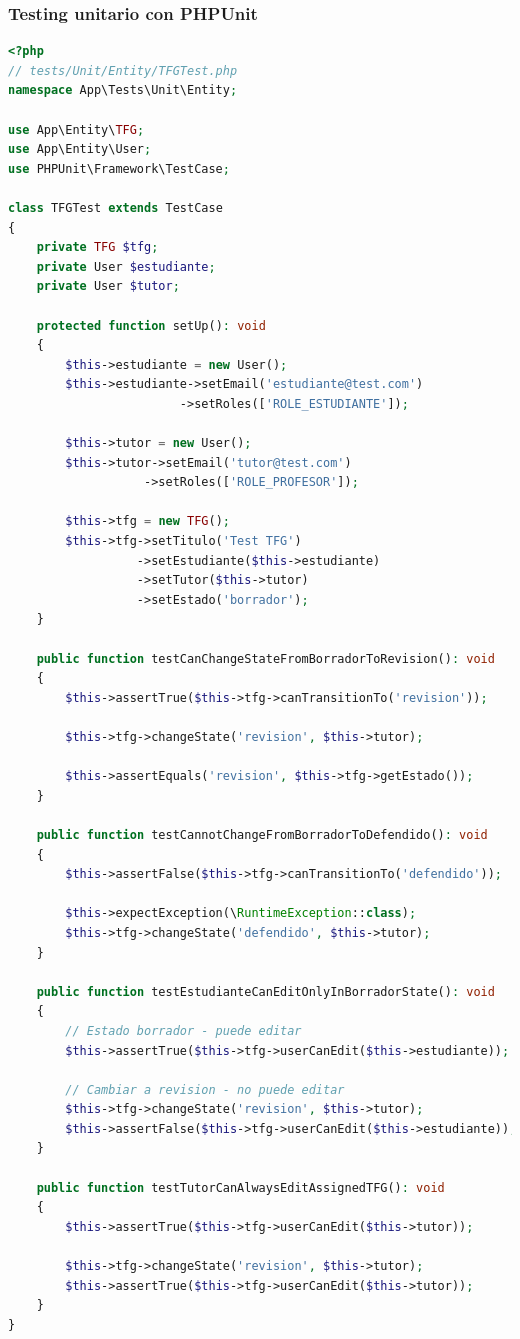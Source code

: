 \documentclass[12pt,a4paper,oneside]{report}
\begin{document}
\subsubsection{Testing unitario con
PHPUnit}\label{testing-unitario-con-phpunit}

\begin{lstlisting}[language=PHP]
<?php
// tests/Unit/Entity/TFGTest.php
namespace App\Tests\Unit\Entity;

use App\Entity\TFG;
use App\Entity\User;
use PHPUnit\Framework\TestCase;

class TFGTest extends TestCase
{
    private TFG $tfg;
    private User $estudiante;
    private User $tutor;

    protected function setUp(): void
    {
        $this->estudiante = new User();
        $this->estudiante->setEmail('estudiante@test.com')
                        ->setRoles(['ROLE_ESTUDIANTE']);

        $this->tutor = new User();
        $this->tutor->setEmail('tutor@test.com')
                   ->setRoles(['ROLE_PROFESOR']);

        $this->tfg = new TFG();
        $this->tfg->setTitulo('Test TFG')
                  ->setEstudiante($this->estudiante)
                  ->setTutor($this->tutor)
                  ->setEstado('borrador');
    }

    public function testCanChangeStateFromBorradorToRevision(): void
    {
        $this->assertTrue($this->tfg->canTransitionTo('revision'));
        
        $this->tfg->changeState('revision', $this->tutor);
        
        $this->assertEquals('revision', $this->tfg->getEstado());
    }

    public function testCannotChangeFromBorradorToDefendido(): void
    {
        $this->assertFalse($this->tfg->canTransitionTo('defendido'));
        
        $this->expectException(\RuntimeException::class);
        $this->tfg->changeState('defendido', $this->tutor);
    }

    public function testEstudianteCanEditOnlyInBorradorState(): void
    {
        // Estado borrador - puede editar
        $this->assertTrue($this->tfg->userCanEdit($this->estudiante));
        
        // Cambiar a revision - no puede editar
        $this->tfg->changeState('revision', $this->tutor);
        $this->assertFalse($this->tfg->userCanEdit($this->estudiante));
    }

    public function testTutorCanAlwaysEditAssignedTFG(): void
    {
        $this->assertTrue($this->tfg->userCanEdit($this->tutor));
        
        $this->tfg->changeState('revision', $this->tutor);
        $this->assertTrue($this->tfg->userCanEdit($this->tutor));
    }
}
\end{lstlisting}
\end{document}
